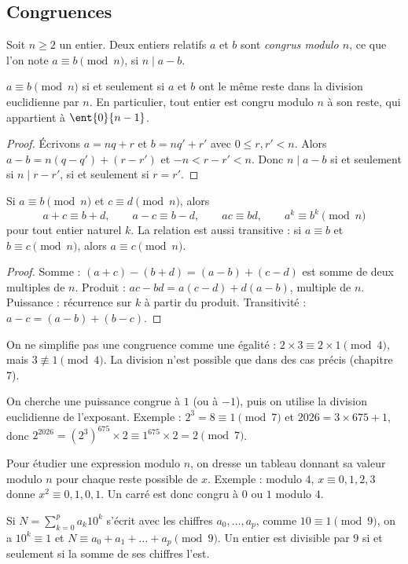 \subsection{Congruences}
\begin{definition}
Soit $n\ge2$ un entier. Deux entiers relatifs $a$ et $b$ sont \emph{congrus modulo $n$}, ce que l'on note $a\equiv b\pmod n$, si $n\mid a-b$.
\end{definition}
\begin{theorem}
$a\equiv b\pmod n$ si et seulement si $a$ et $b$ ont le même reste dans la division euclidienne par $n$. En particulier, tout entier est congru modulo $n$ à son reste, qui appartient à $\ent{0}{n-1}$.
\end{theorem}
\begin{proof}
Écrivons $a=nq+r$ et $b=nq'+r'$ avec $0\le r,r'<n$. Alors $a-b=n(q-q')+(r-r')$ et $-n<r-r'<n$. Donc $n\mid a-b$ si et seulement si $n\mid r-r'$, si et seulement si $r=r'$.
\end{proof}
\begin{theorem}
Si $a\equiv b\pmod n$ et $c\equiv d\pmod n$, alors
\[a+c\equiv b+d,\qquad a-c\equiv b-d,\qquad ac\equiv bd,\qquad a^k\equiv b^k\pmod n\]
pour tout entier naturel $k$. La relation est aussi transitive : si $a\equiv b$ et $b\equiv c\pmod n$, alors $a\equiv c\pmod n$.
\end{theorem}
\begin{proof}
Somme : $(a+c)-(b+d)=(a-b)+(c-d)$ est somme de deux multiples de $n$. Produit : $ac-bd=a(c-d)+d(a-b)$, multiple de $n$. Puissance : récurrence sur $k$ à partir du produit. Transitivité : $a-c=(a-b)+(b-c)$.
\end{proof}
\begin{pitfall}
On ne simplifie pas une congruence comme une égalité : $2\times3\equiv2\times1\pmod4$, mais $3\not\equiv1\pmod4$. La division n'est possible que dans des cas précis (chapitre 7).
\end{pitfall}
\begin{method}
On cherche une puissance congrue à $1$ (ou à $-1$), puis on utilise la division euclidienne de l'exposant. Exemple : $2^3=8\equiv1\pmod7$ et $\num{2026}=3\times675+1$, donc $2^{2026}=\left(2^3\right)^{675}\times2\equiv1^{675}\times2=2\pmod7$.
\end{method}
\begin{method}
Pour étudier une expression modulo $n$, on dresse un tableau donnant sa valeur modulo $n$ pour chaque reste possible de $x$. Exemple : modulo $4$, $x\equiv0,1,2,3$ donne $x^2\equiv0,1,0,1$. Un carré est donc congru à $0$ ou $1$ modulo $4$.
\end{method}
\begin{method}
Si $N=\sum_{k=0}^{p}a_k10^k$ s'écrit avec les chiffres $a_0,\dots,a_p$, comme $10\equiv1\pmod9$, on a $10^k\equiv1$ et $N\equiv a_0+a_1+\dots+a_p\pmod9$. Un entier est divisible par $9$ si et seulement si la somme de ses chiffres l'est.
\end{method}

